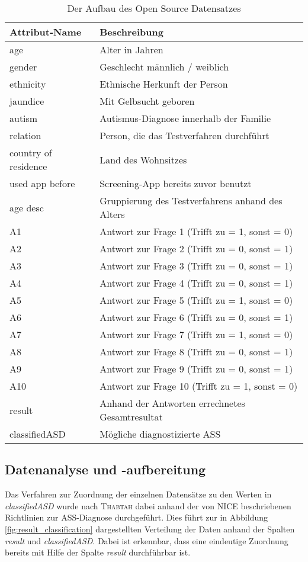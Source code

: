 \begin{table}[htbp]
\caption{Der Aufbau des Open Source Datensatzes}
\begin{tabular}{l p{6cm}}
\textbf{Attribut-Name} & \textbf{Beschreibung}\\ \hline
age & Alter in Jahren\\
gender & Geschlecht männlich / weiblich\\
ethnicity & Ethnische Herkunft der Person\\
jaundice	 & Mit Gelbsucht geboren\\
autism & Autismus-Diagnose innerhalb der Familie\\
relation & Person, die das Testverfahren durchführt\\
country of residence & Land des Wohnsitzes  \\
used app before & Screening-App bereits zuvor benutzt\\
age desc & Gruppierung des Testverfahrens anhand des Alters\\
A1 & Antwort zur Frage 1 (Trifft zu = 1, sonst = 0)\\
A2 & Antwort zur Frage 2 (Trifft zu = 0, sonst = 1)\\
A3 & Antwort zur Frage 3 (Trifft zu = 0, sonst = 1)\\
A4 & Antwort zur Frage 4 (Trifft zu = 0, sonst = 1)\\
A5 & Antwort zur Frage 5 (Trifft zu = 1, sonst = 0)\\
A6 & Antwort zur Frage 6 (Trifft zu = 0, sonst = 1)\\
A7 & Antwort zur Frage 7 (Trifft zu = 1, sonst = 0)\\
A8 & Antwort zur Frage 8 (Trifft zu = 0, sonst = 1)\\
A9 & Antwort zur Frage 9 (Trifft zu = 0, sonst = 1)\\
A10 & Antwort zur Frage 10 (Trifft zu = 1, sonst = 0)\\
result & Anhand der Antworten errechnetes Gesamtresultat\\
classifiedASD & Mögliche diagnostizierte ASS\\
\end{tabular}
\centering
\label{tbl:datensatz}
\end{table}

\subsection{Datenanalyse und -aufbereitung} \label{sec:analysis}
Das Verfahren zur Zuordnung der einzelnen Datensätze zu den Werten in \textit{classifiedASD} wurde nach \textsc{Thabtah} \cite{Thabtah2017} dabei anhand der von \textsc{NICE} \cite{NICE2012} beschriebenen Richtlinien zur ASS-Diagnose durchgeführt. Dies führt zur in Abbildung \ref{fig:result_classification} dargestellten Verteilung der Daten anhand der Spalten \textit{result} und \textit{classifiedASD}. Dabei ist erkennbar, dass eine eindeutige Zuordnung bereits mit Hilfe der Spalte \textit{result} durchführbar ist.


